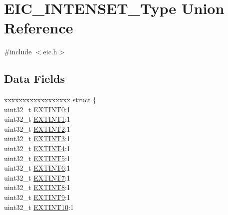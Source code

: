 \hypertarget{union_e_i_c___i_n_t_e_n_s_e_t___type}{}\section{E\+I\+C\+\_\+\+I\+N\+T\+E\+N\+S\+E\+T\+\_\+\+Type Union Reference}
\label{union_e_i_c___i_n_t_e_n_s_e_t___type}


{\ttfamily \#include $<$eic.\+h$>$}

\subsection*{Data Fields}
\begin{DoxyCompactItemize}
\item 
\begin{tabbing}
xx\=xx\=xx\=xx\=xx\=xx\=xx\=xx\=xx\=\kill
struct \{\\
\>uint32\_t \mbox{\hyperlink{union_e_i_c___i_n_t_e_n_s_e_t___type_abf48df6e6aba15d7c5c32780d797e303}{EXTINT0}}:1\\
\>uint32\_t \mbox{\hyperlink{union_e_i_c___i_n_t_e_n_s_e_t___type_a0fcc07121c60150909b8cd851f7107a5}{EXTINT1}}:1\\
\>uint32\_t \mbox{\hyperlink{union_e_i_c___i_n_t_e_n_s_e_t___type_ac22e13e7a1e49df3ca9d32b9abade6cb}{EXTINT2}}:1\\
\>uint32\_t \mbox{\hyperlink{union_e_i_c___i_n_t_e_n_s_e_t___type_a6bbe860ee6b1e9843ce1958b88160a3d}{EXTINT3}}:1\\
\>uint32\_t \mbox{\hyperlink{union_e_i_c___i_n_t_e_n_s_e_t___type_afacd28dc6b8e38374f87619ec39d4dcb}{EXTINT4}}:1\\
\>uint32\_t \mbox{\hyperlink{union_e_i_c___i_n_t_e_n_s_e_t___type_aa752c741b9b2e2cc40192797955f9636}{EXTINT5}}:1\\
\>uint32\_t \mbox{\hyperlink{union_e_i_c___i_n_t_e_n_s_e_t___type_ac8c3b2520eaffe74aad83731fa9eba81}{EXTINT6}}:1\\
\>uint32\_t \mbox{\hyperlink{union_e_i_c___i_n_t_e_n_s_e_t___type_a33bcabe57bdd1f0cec51aba92174fda6}{EXTINT7}}:1\\
\>uint32\_t \mbox{\hyperlink{union_e_i_c___i_n_t_e_n_s_e_t___type_aab9d762f86dec3f39445ee2ad1c41196}{EXTINT8}}:1\\
\>uint32\_t \mbox{\hyperlink{union_e_i_c___i_n_t_e_n_s_e_t___type_abd6774c81c28d04fbef1daa87929c1d3}{EXTINT9}}:1\\
\>uint32\_t \mbox{\hyperlink{union_e_i_c___i_n_t_e_n_s_e_t___type_a1c59062a462e17292e550f8447adce30}{EXTINT10}}:1\\

\end{tabbing}
\end{DoxyCompactItemize}
